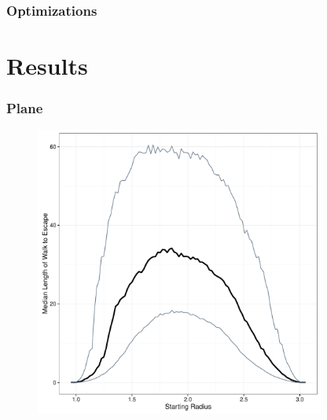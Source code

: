 \documentclass{beamer}
\begin{document}
\begin{frame}
	
	\frametitle{Optimizations}
	
\end{frame}

\section{Results}

\begin{frame}

	\frametitle{Plane}
	
	\begin{figure}
		\includegraphics[width=0.85\textwidth]{images/PlaneIn1Out3.pdf}
	\end{figure}

\end{frame}

\end{document}

